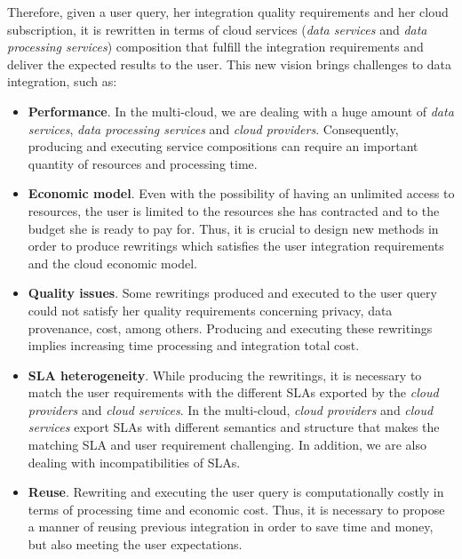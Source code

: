 Therefore, given a user query, her integration quality requirements and her cloud subscription, it is rewritten in terms of cloud services (\textit{data services} and \textit{data processing services}) composition that fulfill the integration requirements and deliver the expected results to the user. This new vision brings challenges to data integration, such as:
\begin{itemize}
\item \textbf{Performance}. In the multi-cloud, we are dealing with a huge amount of \textit{data services}, \textit{data processing services} and \textit{cloud providers}. Consequently, producing and executing service compositions can require an important quantity of resources and processing time.
\item \textbf{Economic model}. Even with the possibility of having an unlimited access to resources, the user is limited to the resources she has contracted and to the budget she is ready to pay for. Thus, it is crucial to design new methods in order to produce rewritings which satisfies the user integration requirements and the cloud economic model. 
\item \textbf{Quality issues}. Some rewritings produced and executed to the user query could not satisfy her quality requirements concerning privacy, data provenance, cost, among others. Producing and executing these rewritings implies increasing time processing and integration total cost. 
\item \textbf{SLA heterogeneity}. While producing the rewritings, it is necessary to match the user requirements with the different SLAs exported by the \textit{cloud providers} and \textit{cloud services}. In the multi-cloud, \textit{cloud providers} and \textit{cloud services} export SLAs with different semantics and structure that makes the matching SLA and user requirement challenging. In addition, we are also dealing with incompatibilities of SLAs.
\item \textbf{Reuse}. Rewriting and executing the user query is computationally costly in terms of processing time and economic cost. Thus, it is necessary to propose a manner of reusing previous integration in order to save time and money, but also meeting the user expectations.
\end{itemize}

